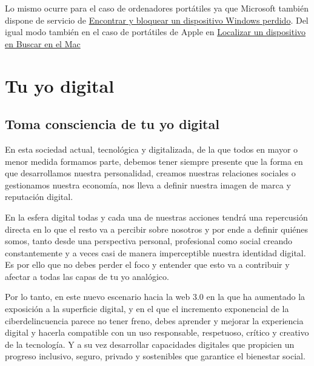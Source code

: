 \documentclass[
  a4paper,
  openany]{book}
\begin{document}
Lo mismo ocurre para el caso de ordenadores portátiles ya que Microsoft también dispone de servicio de \href{https://support.microsoft.com/es-es/account-billing/encontrar-y-bloquear-un-dispositivo-windows-perdido-890bf25e-b8ba-d3fe-8253-e98a12f26316\#:~:text=Activa\%20Encontrar\%20mi\%20dispositivo\&text=Windows\%2011\%3A\%20selecciona\%20InicioConfiguraci\%C3\%B3n,privacidad\%20\%26\%20\%3E\%20Encuentra\%20mi\%20dispositivo.}{Encontrar y bloquear un dispositivo Windows perdido}. Del igual modo también en el caso de portátiles de Apple en \href{https://support.apple.com/es-es/guide/findmy-mac/fmmc6c7ef383/mac}{Localizar un dispositivo en Buscar en el Mac}

\hypertarget{tu-yo-digital}{%
\chapter{Tu yo digital}\label{tu-yo-digital}}

\hypertarget{toma-consciencia-de-tu-yo-digital}{%
\section{Toma consciencia de tu yo digital}\label{toma-consciencia-de-tu-yo-digital}}

En esta sociedad actual, tecnológica y digitalizada, de la que todos en mayor o menor medida formamos parte, debemos tener siempre presente que la forma en que desarrollamos nuestra personalidad, creamos nuestras relaciones sociales o gestionamos nuestra economía, nos lleva a definir nuestra imagen de marca y reputación digital.

En la esfera digital todas y cada una de nuestras acciones tendrá una repercusión directa en lo que el resto va a percibir sobre nosotros y por ende a definir quiénes somos, tanto desde una perspectiva personal, profesional como social creando constantemente y a veces casi de manera imperceptible nuestra identidad digital. Es por ello que no debes perder el foco y entender que esto va a contribuir y afectar a todas las capas de tu yo analógico.

Por lo tanto, en este nuevo escenario hacia la web 3.0 en la que ha aumentado la exposición a la superficie digital, y en el que el incremento exponencial de la ciberdelincuencia parece no tener freno, debes aprender y mejorar la experiencia digital y hacerla compatible con un uso responsable, respetuoso, crítico y creativo de la tecnología. Y a su vez desarrollar capacidades digitales que propicien un progreso inclusivo, seguro, privado y sostenibles que garantice el bienestar social.
\end{document}
